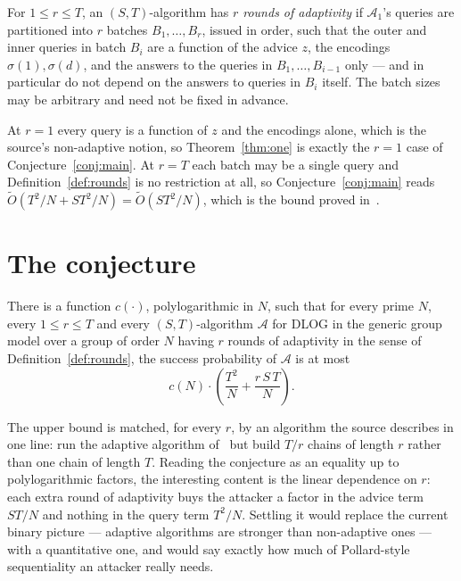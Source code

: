 \documentclass{conjura-conjecture}
\newcommand{\Adv}{\mathcal{A}}
\newcommand{\Ot}{\widetilde{O}}
\begin{document}
\begin{definition}\label{def:rounds}
For $1 \le r \le T$, an $(S,T)$-algorithm has \emph{$r$ rounds of
adaptivity} if $\Adv_{1}$'s queries are partitioned into $r$ batches
$B_{1}, \dots, B_{r}$, issued in order, such that the outer and inner
queries in batch $B_{i}$ are a function of the advice $z$, the
encodings $\sigma(1), \sigma(d)$, and the answers to the queries in
$B_{1}, \dots, B_{i-1}$ only --- and in particular do not depend on the
answers to queries in $B_{i}$ itself. The batch sizes may be arbitrary
and need not be fixed in advance.
\end{definition}

\begin{remark}
At $r = 1$ every query is a function of $z$ and the encodings alone,
which is the source's non-adaptive notion, so
Theorem~\ref{thm:one} is exactly the $r = 1$ case of
Conjecture~\ref{conj:main}. At $r = T$ each batch may be a single
query and Definition~\ref{def:rounds} is no restriction at all, so
Conjecture~\ref{conj:main} reads $\Ot(T^{2}/N + ST^{2}/N) =
\Ot(ST^{2}/N)$, which is the bound proved in~\cite{CK18}.
\end{remark}

\section{The conjecture}\label{sec:conjectures}

\begin{conjecture}\label{conj:main}
There is a function $c(\cdot)$, polylogarithmic in $N$, such that for
every prime $N$, every $1 \le r \le T$ and every $(S,T)$-algorithm
$\Adv$ for DLOG in the generic group model over a group of order $N$
having $r$ rounds of adaptivity in the sense of
Definition~\ref{def:rounds}, the success probability of $\Adv$ is at
most
\[
  c(N) \cdot \left( \frac{T^{2}}{N} + \frac{r \, S \, T}{N} \right).
\]
\end{conjecture}

\begin{remark}
The upper bound is matched, for every $r$, by an algorithm the source
describes in one line: run the adaptive algorithm
of~\cite{BL13,CK18,Mih10} but build $T/r$ chains of length $r$ rather
than one chain of length $T$. Reading the conjecture as an equality up
to polylogarithmic factors, the interesting content is the linear
dependence on $r$: each extra round of adaptivity buys the attacker a
factor in the advice term $ST/N$ and nothing in the query term
$T^{2}/N$. Settling it would replace the current binary picture ---
adaptive algorithms are stronger than non-adaptive ones --- with a
quantitative one, and would say exactly how much of Pollard-style
sequentiality an attacker really needs.
\end{remark}
\end{document}
